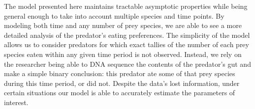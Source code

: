 The model presented here maintains tractable asymptotic properties while being general enough to take into account multiple species and time points.  By modeling both time and any number of prey species, we are able to see a more detailed analysis of the predator's eating preferences.  The simplicity of the model allows us to consider predators for which exact tallies of the number of each prey species eaten within any given time period is not observed.  Instead, we rely on the researcher being able to DNA sequence the contents of the predator's gut and make a simple binary conclusion: this predator ate some of that prey species during this time period, or did not.  Despite the data's lost information, under certain situations our model is able to accurately estimate the parameters of interest.

